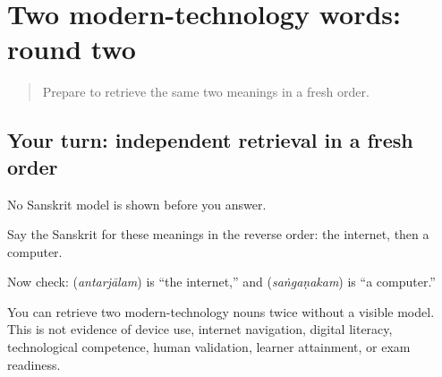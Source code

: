 \section[(independent modern-technology …]{Two modern-technology words: round two}

\label{lesson:SA-C270-modern-technology-final-retrieval}



\begin{quote}
Prepare to retrieve the same two meanings in a fresh order.
\end{quote}

\subsection*{Your turn: independent retrieval in a fresh order}
No Sanskrit model is shown before you answer.

Say the Sanskrit for these meanings in the reverse order: the internet, then a computer.

\begin{grammarlens}[title={What you've built: check after answering}]
Now check: \textbf{} (\emph{antarjālam}) is “the internet,” and \textbf{} (\emph{saṅgaṇakam}) is “a computer.”
\end{grammarlens}

\begin{tcolorbox}[breakable,colback=teal!4,colframe=teal!35!black,title={Before you move on}]
You can retrieve two modern-technology nouns twice without a visible model. This is not evidence of device use, internet navigation, digital literacy, technological competence, human validation, learner attainment, or exam readiness.
\end{tcolorbox}
